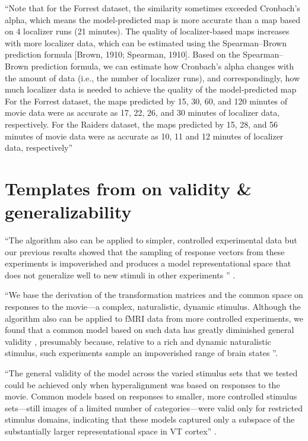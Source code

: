 %
``Note that for the Forrest dataset, the similarity sometimes exceeded
Cronbach's alpha, which means the model-predicted map is more accurate than a
map based on 4 localizer runs (21 minutes).
%
The quality of localizer-based maps increases with more localizer data, which
can be estimated using the Spearman–Brown prediction formula [Brown, 1910;
Spearman, 1910].
%
Based on the Spearman–Brown prediction formula, we can estimate how Cronbach's
alpha changes with the amount of data (i.e., the number of localizer runs), and
correspondingly, how much localizer data is needed to achieve the quality of the
model-predicted map
%
For the Forrest dataset, the maps predicted by 15, 30, 60, and 120 minutes of
movie data were as accurate as 17, 22, 26, and 30 minutes of localizer data,
respectively.
%
For the Raiders dataset, the maps predicted by 15, 28, and 56 minutes of movie
data were as accurate as 10, 11 and 12 minutes of localizer data, respectively''
\citep{feilong2022individualized}


\pagebreak

\section{Templates from \citet{haxby2011common} on validity \& generalizability}

%
``The algorithm also can be applied to simpler, controlled experimental data but
our previous results showed that the sampling of response vectors from these
experiments is impoverished and produces a model representational space that
does not generalize well to new stimuli in other experiments
\citep{haxby2020hyperalignment}'' \citep{guntupalli2016model}.

%
``We base the derivation of the transformation matrices and the common space on
responses to the movie---a complex, naturalistic, dynamic stimulus.
%
Although the algorithm also can be applied to fMRI data from more controlled
experiments, we found that a common model based on such data has greatly
diminished general validity \citep{haxby2011common}, presumably because,
relative to a rich and dynamic naturalistic stimulus, such experiments sample an
impoverished range of brain states \citep{guntupalli2016model}''.

``The general validity of the model across the varied stimulus sets that we
tested could be achieved only when hyperalignment was based on responses to the
movie.
%
Common models based on responses to smaller, more controlled stimulus
sets---still images of a limited number of categories---were valid only for
restricted stimulus domains, indicating that these models captured only a
subspace of the substantially larger representational space in VT cortex''
\citep{haxby2011common}.

